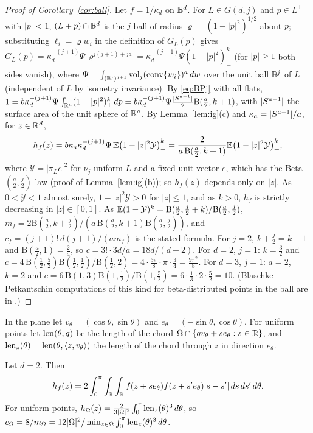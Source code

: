 \documentclass[11pt]{article}
\begin{document}
\begin{proof}[Proof of Corollary~\ref{cor:ball}]
Let $f=1/\kappa_d$ on $\mathbb{B}^d$. For $L\in G(d,j)$ and $p\in L^\perp$ with $|p|<1$, $(L+p)\cap\mathbb{B}^d$ is the $j$-ball of radius
$\varrho=(1-|p|^2)^{1/2}$ about $p$; substituting $\ell_i=\varrho w_i$ in the definition of $G_L(p)$ gives
$G_L(p)=\kappa_d^{-(j+1)}\Psi\,\varrho^{j(j+1)+ja}=\kappa_d^{-(j+1)}\Psi(1-|p|^2)_+^{k}$ (for $|p|\ge1$ both sides vanish), where $\Psi=\int_{(\mathbb{B}^j)^{j+1}}\operatorname{vol}_j(\operatorname{conv}\{w_i\})^a\,dw$
over the unit ball $\mathbb{B}^j$ of $L$ (independent of $L$ by isometry invariance). By \eqref{eq:BPj} with all flats,
$1=b\kappa_d^{-(j+1)}\Psi\int_{\mathbb{R}^a}(1-|p|^2)_+^k\,dp=b\kappa_d^{-(j+1)}\Psi\frac{|S^{a-1}|}2\mathrm B(\frac a2,k+1)$, with $|S^{a-1}|$ the
surface area of the unit sphere of $\mathbb{R}^a$. By Lemma~\ref{lem:ig}(c) and $\kappa_a=|S^{a-1}|/a$, for $z\in\mathbb{R}^d$,
\[
  h_f(z)=b\kappa_a\kappa_d^{-(j+1)}\Psi\,\mathbb{E}\bigl(1-|z|^2\mathcal Y\bigr)_+^k=\frac{2}{a\,\mathrm B(\frac a2,k+1)}\mathbb{E}\bigl(1-|z|^2\mathcal Y\bigr)_+^k,
\]
where $\mathcal Y=|\pi_Le|^2$ for $\nu_j$-uniform $L$ and a fixed unit vector $e$, which has the Beta$(\frac a2,\frac j2)$ law (proof of
Lemma~\ref{lem:ig}(b)); so $h_f(z)$ depends only on $|z|$. As $0<\mathcal Y<1$ almost surely, $1-|z|^2\mathcal Y>0$ for $|z|\le1$, and as $k>0$,
$h_f$ is strictly decreasing in $|z|\in[0,1]$. As $\mathbb{E}(1-\mathcal Y)^k=\mathrm B(\frac a2,\frac j2+k)/\mathrm B(\frac a2,\frac j2)$,
$m_f=2\mathrm B(\frac a2,k+\frac j2)/(a\,\mathrm B(\frac a2,k+1)\mathrm B(\frac a2,\frac j2))$, and $c_f=(j+1)!\,d(j+1)/(am_f)$ is the stated formula.
For $j=2$, $k+\frac j2=k+1$ and $\mathrm B(\frac a2,1)=\frac2a$, so $c=3!\cdot3d/a=18d/(d-2)$. For $d=2$, $j=1$: $k=\frac32$ and
$c=4\,\mathrm B(\frac12,\frac52)\mathrm B(\frac12,\frac12)/\mathrm B(\frac12,2)=4\cdot\frac{3\pi}8\cdot\pi\cdot\frac34=\frac{9\pi^2}8$. For $d=3$, $j=1$: $a=2$,
$k=2$ and $c=6\,\mathrm B(1,3)\mathrm B(1,\frac12)/\mathrm B(1,\frac52)=6\cdot\frac13\cdot2\cdot\frac52=10$. (Blaschke--Petkantschin computations of this kind
for beta-distributed points in the ball are in \cite{KTT,RM}.)
\end{proof}

In the plane let $v_\theta=(\cos\theta,\sin\theta)$ and $e_\theta=(-\sin\theta,\cos\theta)$. For uniform points let $\operatorname{len}(\theta,q)$ be the length
of the chord $\Omega\cap\{qv_\theta+se_\theta:s\in\mathbb{R}\}$, and $\operatorname{len}_z(\theta)=\operatorname{len}(\theta,\langle z,v_\theta\rangle)$ the length of the chord through $z$ in
direction $e_\theta$.

\begin{corollary}\label{cor:plane}
Let $d=2$. Then
\[
  h_f(z)=2\int_0^\pi\int_{\mathbb{R}}\int_{\mathbb{R}} f(z+se_\theta)f(z+s'e_\theta)|s-s'|\,ds\,ds'\,d\theta .
\]
For uniform points, $h_\Omega(z)=\frac{2}{3|\Omega|^2}\int_0^\pi\operatorname{len}_z(\theta)^3\,d\theta$, so
$c_\Omega=8/m_\Omega=12|\Omega|^2/\min_{z\in\Omega}\int_0^\pi\operatorname{len}_z(\theta)^3\,d\theta$.
\end{corollary}
\end{document}
